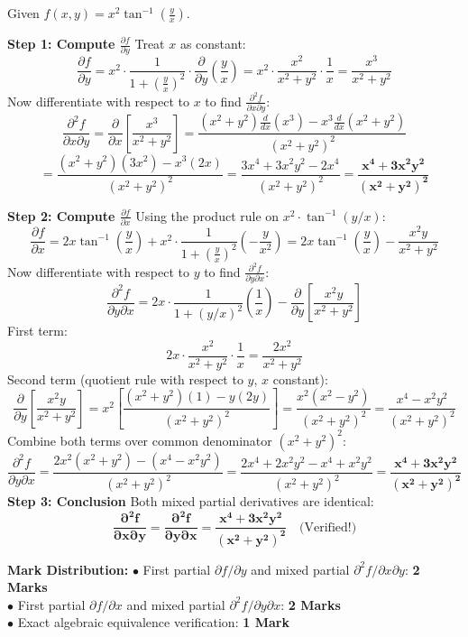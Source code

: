 \begin{solutionbox}
Given $f(x,y) = x^2 \tan^{-1}\left(\frac{y}{x}\right)$.

\textbf{Step 1: Compute $\frac{\partial f}{\partial y}$}
Treat $x$ as constant:
\[
\frac{\partial f}{\partial y} = x^2 \cdot \frac{1}{1 + \left(\frac{y}{x}\right)^2} \cdot \frac{\partial}{\partial y}\left(\frac{y}{x}\right) = x^2 \cdot \frac{x^2}{x^2 + y^2} \cdot \frac{1}{x} = \frac{x^3}{x^2 + y^2}
\]
Now differentiate with respect to $x$ to find $\frac{\partial^2 f}{\partial x \partial y}$:
\[
\frac{\partial^2 f}{\partial x \partial y} = \frac{\partial}{\partial x}\left[\frac{x^3}{x^2 + y^2}\right] = \frac{(x^2 + y^2)\frac{d}{dx}(x^3) - x^3 \frac{d}{dx}(x^2 + y^2)}{(x^2 + y^2)^2}
\]
\[
= \frac{(x^2 + y^2)(3x^2) - x^3(2x)}{(x^2 + y^2)^2} = \frac{3x^4 + 3x^2 y^2 - 2x^4}{(x^2 + y^2)^2} = \mathbf{\frac{x^4 + 3x^2 y^2}{(x^2 + y^2)^2}}
\]

\textbf{Step 2: Compute $\frac{\partial f}{\partial x}$}
Using the product rule on $x^2 \cdot \tan^{-1}(y/x)$:
\[
\frac{\partial f}{\partial x} = 2x \tan^{-1}\left(\frac{y}{x}\right) + x^2 \cdot \frac{1}{1 + \left(\frac{y}{x}\right)^2} \left(-\frac{y}{x^2}\right) = 2x \tan^{-1}\left(\frac{y}{x}\right) - \frac{x^2 y}{x^2 + y^2}
\]
Now differentiate with respect to $y$ to find $\frac{\partial^2 f}{\partial y \partial x}$:
\[
\frac{\partial^2 f}{\partial y \partial x} = 2x \cdot \frac{1}{1 + (y/x)^2} \left(\frac{1}{x}\right) - \frac{\partial}{\partial y}\left[\frac{x^2 y}{x^2 + y^2}\right]
\]
First term:
\[
2x \cdot \frac{x^2}{x^2 + y^2} \cdot \frac{1}{x} = \frac{2x^2}{x^2 + y^2}
\]
Second term (quotient rule with respect to $y$, $x$ constant):
\[
\frac{\partial}{\partial y}\left[\frac{x^2 y}{x^2 + y^2}\right] = x^2 \left[\frac{(x^2 + y^2)(1) - y(2y)}{(x^2 + y^2)^2}\right] = \frac{x^2(x^2 - y^2)}{(x^2 + y^2)^2} = \frac{x^4 - x^2 y^2}{(x^2 + y^2)^2}
\]
Combine both terms over common denominator $(x^2+y^2)^2$:
\[
\frac{\partial^2 f}{\partial y \partial x} = \frac{2x^2(x^2 + y^2) - (x^4 - x^2 y^2)}{(x^2 + y^2)^2} = \frac{2x^4 + 2x^2 y^2 - x^4 + x^2 y^2}{(x^2 + y^2)^2} = \mathbf{\frac{x^4 + 3x^2 y^2}{(x^2 + y^2)^2}}
\]
\textbf{Step 3: Conclusion}
Both mixed partial derivatives are identical:
\[
\mathbf{\frac{\partial^2 f}{\partial x \partial y} = \frac{\partial^2 f}{\partial y \partial x} = \frac{x^4 + 3x^2 y^2}{(x^2 + y^2)^2}} \quad \text{(Verified!)}
\]

\begin{markingrubric}
\textbf{Mark Distribution:}
$\bullet$ First partial $\partial f/\partial y$ and mixed partial $\partial^2 f/\partial x \partial y$: \textbf{2 Marks}\\
$\bullet$ First partial $\partial f/\partial x$ and mixed partial $\partial^2 f/\partial y \partial x$: \textbf{2 Marks}\\
$\bullet$ Exact algebraic equivalence verification: \textbf{1 Mark}
\end{markingrubric}
\end{solutionbox}

